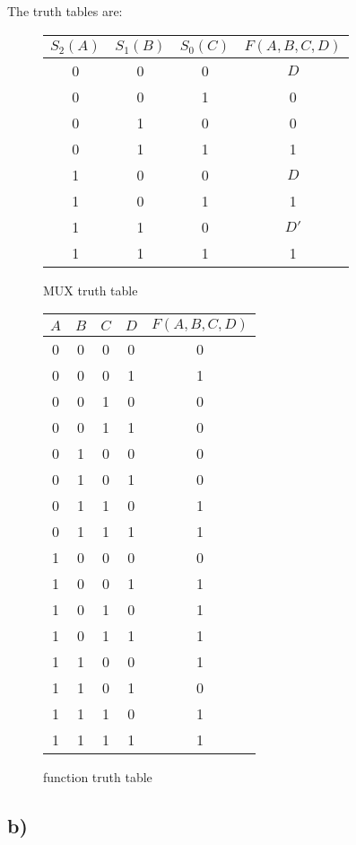 \documentclass[a4paper,12pt]{article}
\begin{document}
The truth tables are:
\begin{figure}[H]
	\begin{minipage}{0.5\textwidth}
		\centering
		\begin{tabular}{cccc}
			\toprule
			$S_2(A)$ & $S_1(B)$ & $S_0(C)$ & $F(A,B,C,D)$ \\
			\midrule
			0 & 0 & 0 & $D$ \\
			0 & 0 & 1 & 0 \\
			0 & 1 & 0 & 0 \\
			0 & 1 & 1 & 1 \\
			1 & 0 & 0 & $D$ \\
			1 & 0 & 1 & 1 \\
			1 & 1 & 0 & $D'$ \\
			1 & 1 & 1 & 1 \\
			\bottomrule
		\end{tabular}
		\caption*{MUX truth table}
	\end{minipage}
	\begin{minipage}{0.5\textwidth}
		\centering
		\begin{tabular}{ccccc}
			\toprule
			$A$ & $B$ & $C$ & $D$ & $F(A,B,C,D)$ \\
			\midrule
			0 & 0 & 0 & 0 & 0 \\
			0 & 0 & 0 & 1 & 1 \\
			0 & 0 & 1 & 0 & 0 \\
			0 & 0 & 1 & 1 & 0 \\
			0 & 1 & 0 & 0 & 0 \\
			0 & 1 & 0 & 1 & 0 \\
			0 & 1 & 1 & 0 & 1 \\
			0 & 1 & 1 & 1 & 1 \\
			1 & 0 & 0 & 0 & 0 \\
			1 & 0 & 0 & 1 & 1 \\
			1 & 0 & 1 & 0 & 1 \\
			1 & 0 & 1 & 1 & 1 \\
			1 & 1 & 0 & 0 & 1 \\
			1 & 1 & 0 & 1 & 0 \\
			1 & 1 & 1 & 0 & 1 \\
			1 & 1 & 1 & 1 & 1 \\
			\bottomrule
		\end{tabular}
		\caption*{function truth table}
	\end{minipage}
\end{figure}

\subsection*{b)}
\end{document}
